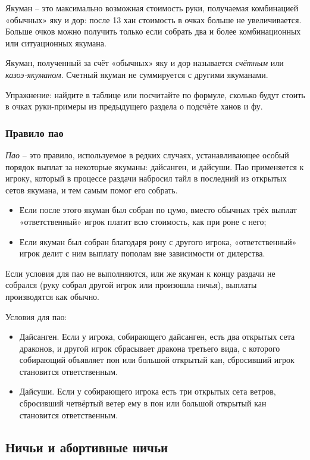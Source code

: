 Якуман – это максимально возможная стоимость руки, получаемая комбинацией «обычных» яку и дор: после 13 хан стоимость в очках больше не увеличивается. Больше очков можно получить только если собрать два и более комбинационных или ситуационных якумана.

Якуман, полученный за счёт «обычных» яку и дор называется \textit{счётным} или \textit{казоэ-якуманом}. Счетный якуман не суммируется с другими якуманами.

Упражнение: найдите в таблице или посчитайте по формуле, сколько будут стоить в очках руки-примеры из предыдущего раздела о подсчёте ханов и фу.

\subsubsection{Правило пао}

\textit{Пао} – это правило, используемое в редких случаях, устанавливающее особый порядок выплат за некоторые якуманы: дайсанген, и дайсуши. 
Пао применяется к игроку, который в процессе раздачи набросил тайл в последний из открытых сетов якумана, и тем самым помог его собрать.
\begin{itemize}
	\item Если после этого якуман был собран по цумо, вместо обычных трёх выплат «ответственный» игрок платит всю стоимость, как при роне с него;
	\item Если якуман был собран благодаря рону с другого игрока, «ответственный» игрок делит с ним выплату пополам вне зависимости от дилерства.
\end{itemize}

Если условия для пао не выполняются, или же якуман к концу раздачи не собрался (руку собрал другой игрок или произошла ничья), выплаты производятся как обычно.

Условия для пао:
\begin{itemize}
	\item Дайсанген. Если у игрока, собирающего дайсанген, есть два открытых сета драконов, и другой игрок сбрасывает дракона третьего вида, с которого собирающий объявляет пон или большой открытый кан, сбросивший игрок становится ответственным.
	\item Дайсуши. Если у собирающего игрока есть три открытых сета ветров, сбросивший четвёртый ветер ему в пон или большой открытый кан становится ответственным.
\end{itemize}

\subsection{Ничьи и абортивные ничьи}


